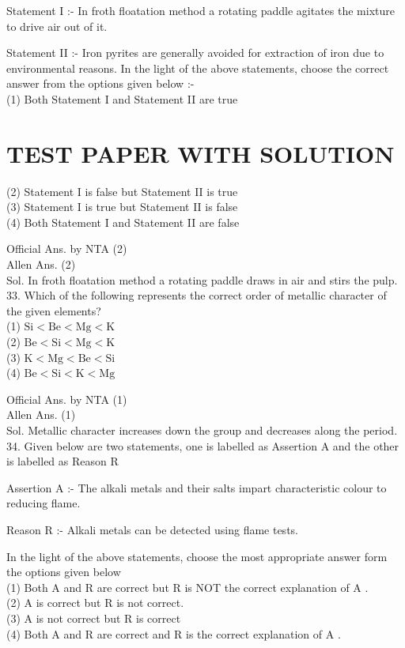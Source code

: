\documentclass[10pt]{article}
\begin{document}
Statement I :- In froth floatation method a rotating paddle agitates the mixture to drive air out of it.

Statement II :- Iron pyrites are generally avoided for extraction of iron due to environmental reasons. In the light of the above statements, choose the correct answer from the options given below :-\\
(1) Both Statement I and Statement II are true

\section*{TEST PAPER WITH SOLUTION}
(2) Statement I is false but Statement II is true\\
(3) Statement I is true but Statement II is false\\
(4) Both Statement I and Statement II are false

Official Ans. by NTA (2)\\
Allen Ans. (2)\\
Sol. In froth floatation method a rotating paddle draws in air and stirs the pulp.\\
33. Which of the following represents the correct order of metallic character of the given elements?\\
(1) \(\mathrm{Si}<\mathrm{Be}<\mathrm{Mg}<\mathrm{K}\)\\
(2) \(\mathrm{Be}<\mathrm{Si}<\mathrm{Mg}<\mathrm{K}\)\\
(3) \(\mathrm{K}<\mathrm{Mg}<\mathrm{Be}<\mathrm{Si}\)\\
(4) \(\mathrm{Be}<\mathrm{Si}<\mathrm{K}<\mathrm{Mg}\)

Official Ans. by NTA (1)\\
Allen Ans. (1)\\
Sol. Metallic character increases down the group and decreases along the period.\\
34. Given below are two statements, one is labelled as Assertion A and the other is labelled as Reason R

Assertion A :- The alkali metals and their salts impart characteristic colour to reducing flame.

Reason R :- Alkali metals can be detected using flame tests.

In the light of the above statements, choose the most appropriate answer form the options given below\\
(1) Both A and R are correct but R is NOT the correct explanation of A .\\
(2) A is correct but R is not correct.\\
(3) A is not correct but R is correct\\
(4) Both A and R are correct and R is the correct explanation of A .
\end{document}
